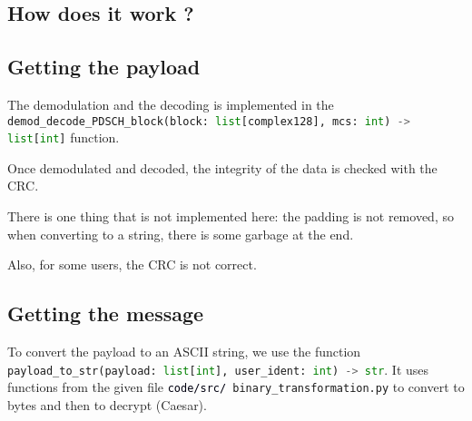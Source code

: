 \documentclass[a4paper, 12pt, twoside]{article}
\begin{document}
\begin{indt}{\section{How does it work ?}}
\begin{indt}{\subsection{Getting the payload}}
            The demodulation and the decoding is implemented in the \lstinline[language=python]{demod_decode_PDSCH_block(block: list[complex128], mcs: int) -> list[int]} function.

            Once demodulated and decoded, the integrity of the data is checked with the CRC.

            There is one thing that is not implemented here: the padding is not removed, so when converting to a string, there is some garbage at the end.

            Also, for some users, the CRC is not correct.
        \end{indt} %

        \begin{indt}{\subsection{Getting the message}} %
            To convert the payload to an ASCII string, we use the function \lstinline[language=python]{payload_to_str(payload: list[int], user_ident: int) -> str}.
            It uses functions from the given file \texttt{\textcolor{00f}{code/src/ }binary\_transformation.py} to convert to bytes and then to decrypt (Caesar).
        \end{indt} %
    \end{indt}%
\end{document}
